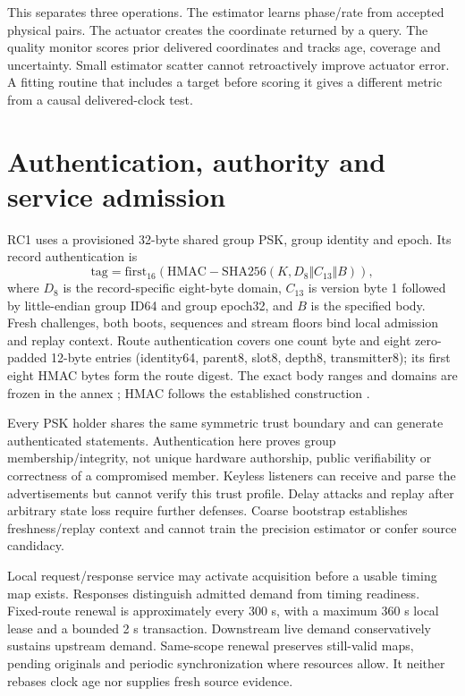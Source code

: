 \documentclass[11pt,letterpaper]{article}
\begin{document}
This separates three operations. The estimator learns phase/rate from accepted physical pairs. The actuator creates the coordinate returned by a query. The quality monitor scores prior delivered coordinates and tracks age, coverage and uncertainty. Small estimator scatter cannot retroactively improve actuator error. A fitting routine that includes a target before scoring it gives a different metric from a causal delivered-clock test.

\section{Authentication, authority and service admission}\label{sec:auth}
RC1 uses a provisioned 32-byte shared group PSK, group identity and epoch. Its record authentication is
\begin{equation}
 \mathrm{tag}=\mathrm{first}_{16}\!\left(\mathrm{HMAC\!\!\!-SHA256}
 (K, D_8\Vert C_{13}\Vert B)\right),\label{eq:mac}
\end{equation}
where $D_8$ is the record-specific eight-byte domain, $C_{13}$ is version byte 1 followed by little-endian group ID64 and group epoch32, and $B$ is the specified body. Fresh challenges, both boots, sequences and stream floors bind local admission and replay context. Route authentication covers one count byte and eight zero-padded 12-byte entries (identity64, parent8, slot8, depth8, transmitter8); its first eight HMAC bytes form the route digest. The exact body ranges and domains are frozen in the annex \cite{v14}; HMAC follows the established construction \cite{hmac}.

Every PSK holder shares the same symmetric trust boundary and can generate authenticated statements. Authentication here proves group membership/integrity, not unique hardware authorship, public verifiability or correctness of a compromised member. Keyless listeners can receive and parse the advertisements but cannot verify this trust profile. Delay attacks and replay after arbitrary state loss require further defenses. Coarse bootstrap establishes freshness/replay context and cannot train the precision estimator or confer source candidacy.

Local request/response service may activate acquisition before a usable timing map exists. Responses distinguish admitted demand from timing readiness. Fixed-route renewal is approximately every 300 s, with a maximum 360 s local lease and a bounded 2 s transaction. Downstream live demand conservatively sustains upstream demand. Same-scope renewal preserves still-valid maps, pending originals and periodic synchronization where resources allow. It neither rebases clock age nor supplies fresh source evidence.
\end{document}
